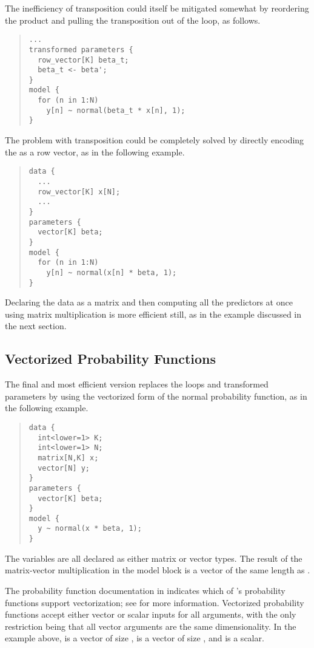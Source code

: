 %
The inefficiency of transposition could itself be mitigated somewhat by
reordering the product and pulling the transposition out of the loop,
as follows.
%
\begin{quote}
\begin{Verbatim}[fontsize=\small]
...
transformed parameters {
  row_vector[K] beta_t;
  beta_t <- beta';
}
model {
  for (n in 1:N)
    y[n] ~ normal(beta_t * x[n], 1);
}
\end{Verbatim}
\end{quote}
%
The problem with transposition could be completely solved by directly
encoding the  as a row vector, as in the
following example.
%
\begin{quote}
\begin{Verbatim}[fontsize=\small]
data {
  ...
  row_vector[K] x[N];
  ...
}
parameters {
  vector[K] beta;
}
model {
  for (n in 1:N)
    y[n] ~ normal(x[n] * beta, 1);
}
\end{Verbatim}
\end{quote}
%
Declaring the data as a matrix and then computing all the predictors
at once using matrix multiplication is more efficient still, as in the
example discussed in the next section.

\subsection{Vectorized Probability Functions}

The final and most efficient version replaces the loops and
transformed parameters by using the vectorized form of the normal
probability function, as in the following example.
%
\begin{quote}
\begin{Verbatim}[fontsize=\small]
data {
  int<lower=1> K;
  int<lower=1> N;
  matrix[N,K] x;
  vector[N] y;
}
parameters {
  vector[K] beta;
} 
model {
  y ~ normal(x * beta, 1);
}
\end{Verbatim}
\end{quote}
%
The variables are all declared as either matrix or vector types.
The result of the matrix-vector multiplication  in the
model block is a vector of the same length as .  

The probability function documentation in 
indicates which of \Stan's probability functions support
vectorization; see  for more
information.  Vectorized probability functions accept either vector or
scalar inputs for all arguments, with the only restriction being that
all vector arguments are the same dimensionality.  In the example
above,  is a vector of size ,  is a
vector of size , and  is a scalar.

